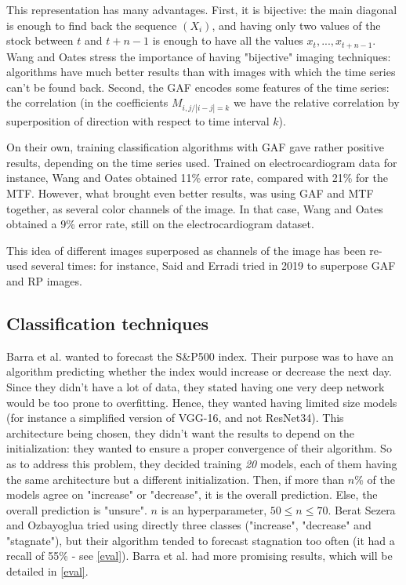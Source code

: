 \documentclass[11pt]{article}
\begin{document}
\begin{onehalfspace}
This representation has many advantages. First, it is bijective: the main diagonal is enough to find back the sequence $(X_i)$, and having only two values of the stock between $t$ and $t+n-1$ is enough to have all the values $x_t, ..., x_{t+n-1}$. Wang and Oates stress the importance of having "bijective" imaging techniques: algorithms have much better results than with images with which the time series can't be found back. Second, the GAF encodes some features of the time series: the correlation (in the coefficients $M_{i,j / |i-j| = k}$ we have the relative correlation by superposition of direction with respect to time interval $k$).

On their own, training classification algorithms with GAF gave rather positive results, depending on the time series used. Trained on electrocardiogram data for instance, Wang and Oates \cite{wang_encod} obtained 11\% error rate, compared with 21\% for the MTF. However, what brought even better results, was using GAF and MTF together, as several color channels of the image. In that case, Wang and Oates \cite{wang} obtained a 9\% error rate, still on the electrocardiogram dataset.

This idea of different images superposed as channels of the image has been re-used several times: for instance, Said and Erradi tried in 2019 \cite{said} to superpose GAF and RP images.

\subsection{Classification techniques}

Barra et al. \cite{barra} wanted to forecast the S\&P500 index. Their purpose was to have an algorithm predicting whether the index would increase or decrease the next day. Since they didn't have a lot of data, they stated having one very deep network would be too prone to overfitting. Hence, they wanted having limited size models (for instance a simplified version of VGG-16, and not ResNet34). This architecture being chosen, they didn't want the results to depend on the initialization: they wanted to ensure a proper convergence of their algorithm. So as to address this problem, they decided training \emph{20} models, each of them having the same architecture but a different initialization. Then, if more than $n$\% of the models agree on "increase" or "decrease", it is the overall prediction. Else, the overall prediction is "unsure". $n$ is an hyperparameter, $50 \leq n \leq 70$. Berat Sezera and Ozbayoglua \cite{berat} tried using directly three classes ("increase", "decrease" and "stagnate"), but their algorithm tended to forecast stagnation too often (it had a recall of 55\% - see \ref{eval}). Barra et al. \cite{barra} had more promising results, which will be detailed in \ref{eval}.


\end{onehalfspace}
\end{document}
